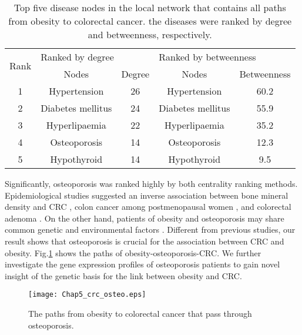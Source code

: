 \begin{table}[h]
\caption{T\lowercase{OP FIVE DISEASE NODES IN THE LOCAL NETWORK THAT CONTAINS ALL PATHS FROM OBESITY TO COLORECTAL CANCER. THE DISEASES WERE RANKED BY DEGREE AND BETWEENNESS, RESPECTIVELY}.}
\label{noderank}
\centering
\begin{tabular}{ccccc}
\hline
\multirow{2}{*}{Rank} & \multicolumn{2}{l}{Ranked by degree} & \multicolumn{2}{l}{Ranked by betweenness} \\
                      & Nodes                  & Degree      & Nodes                  & Betweenness      \\\hline
1                     & Hypertension           & 26          & Hypertension           & 60.2             \\
2                     & Diabetes mellitus      & 24          & Diabetes mellitus      & 55.9             \\
3                     & Hyperlipaemia          & 22          & Hyperlipaemia          & 35.2             \\
4                     & Osteoporosis           & 14          & Osteoporosis           & 12.3             \\
5                     & Hypothyroid            & 14          & Hypothyroid            & 9.5 \\\hline
\end{tabular}
\end{table}

Significantly, osteoporosis was ranked highly by both centrality ranking methods. Epidemiological studies suggested an inverse association between bone mineral density and CRC \cite{nelson2002bone},
colon cancer among postmenopausal women \cite{ganry2008bone},
and colorectal adenoma \cite{nock2011higher}.
On the other hand, patients of obesity and osteoporosis may share common genetic and environmental factors \cite{zhao2007relationship}.
Different from previous studies, our result shows that osteoporosis is crucial for the association between CRC and obesity. Fig.\ref{localnet} shows the paths of obesity-osteoporosis-CRC. We further investigate the gene expression profiles of osteoporosis patients to gain novel insight of the genetic basis for the link between obesity and CRC.
\begin{figure}[!ht]
\vspace{-0.6cm}
\begin{center}
\texttt{[image: Chap5\_crc\_osteo.eps]}
\end{center}
\vspace{-0.5cm}
\caption{
{The paths from obesity to colorectal cancer that pass through osteoporosis.}
}
\vspace{-0.5cm}
\label{localnet}
\end{figure}


